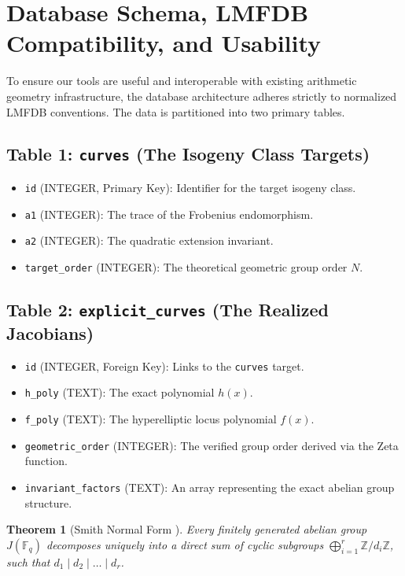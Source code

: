 \documentclass[letterpaper, 11pt]{article}
\newtheorem{theorem}{Theorem}[section]
\begin{document}
\section{Database Schema, LMFDB Compatibility, and Usability}
To ensure our tools are useful and interoperable with existing arithmetic geometry infrastructure, the database architecture adheres strictly to normalized LMFDB conventions. The data is partitioned into two primary tables.

\subsection{Table 1: \texttt{curves} (The Isogeny Class Targets)}
\begin{itemize}
    \item \texttt{id} (INTEGER, Primary Key): Identifier for the target isogeny class.
    \item \texttt{a1} (INTEGER): The trace of the Frobenius endomorphism.
    \item \texttt{a2} (INTEGER): The quadratic extension invariant.
    \item \texttt{target\_order} (INTEGER): The theoretical geometric group order $N$.
\end{itemize}

\subsection{Table 2: \texttt{explicit\_curves} (The Realized Jacobians)}
\begin{itemize}
    \item \texttt{id} (INTEGER, Foreign Key): Links to the \texttt{curves} target.
    \item \texttt{h\_poly} (TEXT): The exact polynomial $h(x)$.
    \item \texttt{f\_poly} (TEXT): The hyperelliptic locus polynomial $f(x)$.
    \item \texttt{geometric\_order} (INTEGER): The verified group order derived via the Zeta function.
    \item \texttt{invariant\_factors} (TEXT): An array representing the exact abelian group structure.
\end{itemize}

\begin{theorem}[Smith Normal Form \cite{Smith1861}]
Every finitely generated abelian group $J(\mathbb{F}_q)$ decomposes uniquely into a direct sum of cyclic subgroups $\bigoplus_{i=1}^r \mathbb{Z}/d_i\mathbb{Z}$, such that $d_1 \mid d_2 \mid \dots \mid d_r$.
\end{theorem}
\end{document}

